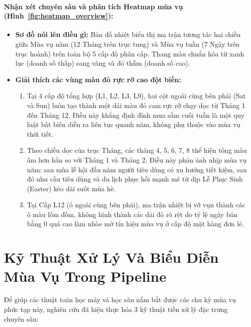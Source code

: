 \documentclass[12pt,a4paper,oneside]{article}
\begin{document}
\paragraph{Nhận xét chuyên sâu và phân tích Heatmap mùa vụ (Hình~\ref{fig:heatmap_overview}):}
\begin{itemize}
    \item \textbf{Sơ đồ nói lên điều gì:} Bản đồ nhiệt biểu thị ma trận tương tác hai chiều giữa Mùa vụ năm (12 Tháng trên trục tung) và Mùa vụ tuần (7 Ngày trên trục hoành) trên toàn bộ 5 cấp độ phân cấp. Thang màu chuẩn hóa từ xanh lục (doanh số thấp) sang vàng và đỏ thẫm (doanh số cao).
    \item \textbf{Giải thích các vùng màu đỏ rực rỡ cao đột biến:}
    \begin{enumerate}
        \item Tại 4 cấp độ tổng hợp (L1, L2, L3, L9), hai cột ngoài cùng bên phải (Sat và Sun) luôn tạo thành một dải màu đỏ cam rực rỡ chạy dọc từ Tháng 1 đến Tháng 12. Điều này khẳng định đỉnh mua sắm cuối tuần là một quy luật bất biến diễn ra liên tục quanh năm, không phụ thuộc vào mùa vụ thời tiết.
        \item Theo chiều dọc của trục Tháng, các tháng 4, 5, 6, 7, 8 thể hiện tông màu ấm hơn hẳn so với Tháng 1 và Tháng 2. Điều này phản ánh nhịp mùa vụ năm: sau mùa lễ hội đầu năm người tiêu dùng có xu hướng tiết kiệm, sau đó nhu cầu tiêu dùng và du lịch phục hồi mạnh mẽ từ dịp Lễ Phục Sinh (Easter) kéo dài suốt mùa hè.
        \item Tại Cấp L12 (ô ngoài cùng bên phải), ma trận nhiệt bị vỡ vụn thành các ô màu lốm đốm, không hình thành các dải đỏ rõ rệt do tỷ lệ ngày bán bằng 0 quá cao làm nhòe mờ tín hiệu mùa vụ ở cấp độ mặt hàng đơn lẻ.
    \end{enumerate}
\end{itemize}

\section{Kỹ Thuật Xử Lý Và Biểu Diễn Mùa Vụ Trong Pipeline}

Để giúp các thuật toán học máy và học sâu nắm bắt được các chu kỳ mùa vụ phức tạp này, nghiên cứu đã hiện thực hóa 3 kỹ thuật tiền xử lý đặc trưng chuyên sâu:
\end{document}
